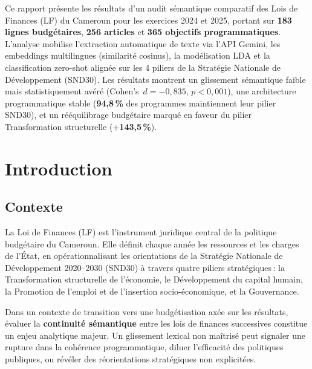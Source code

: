 \documentclass[12pt, a4paper]{article}
\newcommand{\pct}[1]{\textbf{#1\,\%}}
\begin{document}
\begin{titlepage}
\begin{tcolorbox}[colback=grisClair, colframe=bleuCMR, width=0.9\linewidth,
  title={\textbf{Résumé exécutif}}, fonttitle=\small\bfseries]
\small
Ce rapport présente les résultats d'un audit sémantique comparatif des Lois de Finances (LF) du
Cameroun pour les exercices 2024 et 2025, portant sur \textbf{183 lignes budgétaires}, \textbf{256 articles} et 
\textbf{365 objectifs programmatiques}. L'analyse mobilise l'extraction automatique de texte via l'API Gemini, 
les embeddings multilingues (similarité cosinus), la modélisation LDA et la classification zero-shot alignée 
sur les 4 piliers de la Stratégie Nationale de Développement (SND30). 
Les résultats montrent un glissement sémantique faible mais statistiquement avéré 
(\mbox{Cohen's $d = -0{,}835$}, \mbox{$p < 0{,}001$}), 
une architecture programmatique stable (\pct{94{,}8} des programmes maintiennent leur pilier SND30), 
et un rééquilibrage budgétaire marqué en faveur du pilier Transformation structurelle (+\pct{143{,}5}).
\end{tcolorbox}

\end{titlepage}

\tableofcontents
\thispagestyle{fancy}
\newpage

\section{Introduction}

\subsection{Contexte}

La Loi de Finances (LF) est l'instrument juridique central de la politique budgétaire du Cameroun. 
Elle définit chaque année les ressources et les charges de l'État, en opérationnalisant les 
orientations de la Stratégie Nationale de Développement 2020--2030 (SND30) à travers quatre piliers 
stratégiques\,: la Transformation structurelle de l'économie, le Développement du capital humain, 
la Promotion de l'emploi et de l'insertion socio-économique, et la Gouvernance.

Dans un contexte de transition vers une budgétisation axée sur les résultats, évaluer la \textbf{continuité 
sémantique} entre les lois de finances successives constitue un enjeu analytique majeur. Un glissement 
lexical non maîtrisé peut signaler une rupture dans la cohérence programmatique, diluer l'efficacité 
des politiques publiques, ou révéler des réorientations stratégiques non explicitées.
\end{document}
